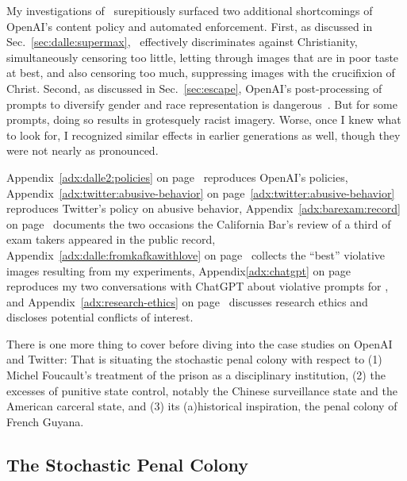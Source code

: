 My investigations of \dalle\ surepitiously surfaced two additional shortcomings
of OpenAI's content policy and automated enforcement. First, as discussed in
Sec.\ \ref{sec:dalle:supermax}, \dalle\ effectively discriminates against
Christianity, simultaneously censoring too little, letting through images that
are in poor taste at best, and also censoring too much, suppressing images with
the crucifixion of Christ. Second, as discussed in Sec.\ \ref{sec:escape},
OpenAI's post-processing of prompts to diversify gender and race representation
is dangerous~\cite{OpenAI2022e,Sparkes2022}. But for some prompts, doing so
results in grotesquely racist imagery. Worse, once I knew what to look for, I
recognized similar effects in earlier generations as well, though they were not
nearly as pronounced.

Appendix~\ref{adx:dalle2:policies} on page~\pageref{adx:dalle2:policies}
reproduces OpenAI's policies, Appendix~\ref{adx:twitter:abusive-behavior} on
page~\ref{adx:twitter:abusive-behavior} reproduces Twitter's policy on abusive
behavior, Appendix~\ref{adx:barexam:record} on page~\pageref{adx:barexam:record}
documents the two occasions the California Bar's review of a third of exam
takers appeared in the public record, Appendix~\ref{adx:dalle:fromkafkawithlove}
on page~\pageref{adx:dalle:fromkafkawithlove} collects the ``best'' violative
images resulting from my experiments, Appendix\ref{adx:chatgpt} on
page~\pageref{adx:chatgpt} reproduces my two conversations with ChatGPT about
violative prompts for \dalle, and Appendix~\ref{adx:research-ethics} on
page~\pageref{adx:research-ethics} discusses research ethics and discloses
potential conflicts of interest.

There is one more thing to cover before diving into the case studies on OpenAI
and Twitter: That is situating the stochastic penal colony with respect to (1)
Michel Foucault's treatment of the prison as a disciplinary institution, (2) the
excesses of punitive state control, notably the Chinese surveillance state and
the American carceral state, and (3) its (a)historical inspiration, the penal
colony of French Guyana.


\subsection{The Stochastic Penal Colony}

